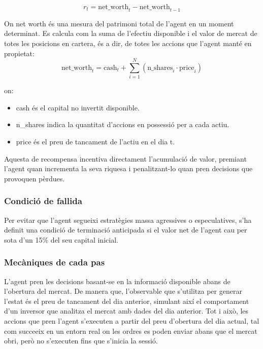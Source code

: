 \documentclass[12pt,a4paper,twoside]{book}
\begin{document}
\begin{equation}
r_t = \text{net\_worth}_t - \text{net\_worth}_{t-1}
\end{equation}


On net worth és una mesura del patrimoni total de l'agent en un moment determinat. Es calcula com la suma de l'efectiu disponible i el valor de mercat de totes les posicions en cartera, és a dir, de totes les accions que l'agent manté en propietat:
\begin{equation}
\text{net\_worth}_t = \text{cash}_t + \sum_{i=1}^{N} \left( \text{n\_shares}_i \cdot \text{price}_i \right)
\end{equation}

on:
\begin{itemize}
    \item cash és el capital no invertit disponible.
    \item n\_shares indica la quantitat d'accions en possessió per a cada actiu.
    \item price és el preu de tancament de l'actiu en el dia t.
\end{itemize}

Aquesta de recompensa incentiva directament l'acumulació de valor, premiant l'agent quan incrementa la seva riquesa i penalitzant-lo quan pren decisions que provoquen pèrdues.

\subsubsection*{Condició de fallida}

Per evitar que l'agent segueixi estratègies massa agressives o especulatives, s'ha definit una condició de terminació anticipada si el valor net de l'agent cau per sota d'un 15\% del seu capital inicial.

\subsubsection{Mecàniques de cada pas}

L'agent pren les decisions basant-se en la informació disponible abans de l'obertura del mercat. De manera que, l'observable que s'utilitza per generar l'estat és el preu de tancament del dia anterior, simulant així el comportament d'un inversor que analitza el mercat amb dades del dia anterior. Tot i això, les accions que pren l'agent s'executen a partir del preu d'obertura del dia actual, tal com succeeix en un entorn real on les ordres es poden enviar abans que el mercat obri, però no s'executen fins que s'inicia la sessió.
\end{document}
